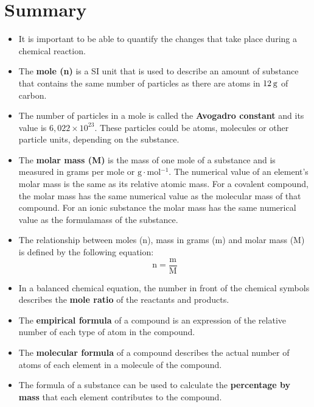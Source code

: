             \section{Summary}
            \nopagebreak
      \label{m38712*id285735}\begin{itemize}[noitemsep]
            \label{m38712*uid107}\item It is important to be able to quantify the changes that take place during a chemical reaction.
\label{m38712*uid108}\item The \textbf{mole (n)} is a SI unit that is used to describe an amount of substance that contains the same number of particles as there are atoms in $12\phantom{\rule{2pt}{0ex}}\text{g}$ of carbon.
\label{m38712*uid109}\item The number of particles in a mole is called the \textbf{Avogadro constant} and its value is $6,022\ensuremath{\times}{10}^{23}$. These particles could be atoms, molecules or other particle units, depending on the substance.
\label{m38712*uid110}\item The \textbf{molar mass (M)} is the mass of one mole of a substance and is measured in grams per mole or $\text{g}\ensuremath{\cdot}\text{mol}{}^{-1}$. The numerical value of an element's molar mass is the same as its relative atomic mass. For a covalent compound, the molar mass has the same numerical value as the molecular mass of that compound. For an ionic substance the molar mass has the same numerical value as the formulamass of the substance.
\label{m38712*uid111}\item The relationship between moles (n), mass in grams (m) and molar mass (M) is defined by the following equation:
\label{m38712*id285862}\nopagebreak\noindent{}
    \begin{equation*}
    \text{n}=\frac{\text{m}}{\text{M}}
      \end{equation*}
    \label{m38712*uid112}\item In a balanced chemical equation, the number in front of the chemical symbols describes the \textbf{mole ratio} of the reactants and products.
\label{m38712*uid113}\item The \textbf{empirical formula} of a compound is an expression of the relative number of each type of atom in the compound.
\label{m38712*uid114}\item The \textbf{molecular formula} of a compound describes the actual number of atoms of each element in a molecule of the compound.
\label{m38712*uid115}\item The formula of a substance can be used to calculate the \textbf{percentage by mass} that each element contributes to the compound.

\end{itemize}
